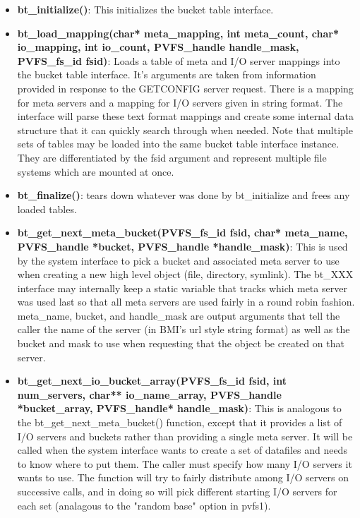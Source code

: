 \documentclass[12pt]{article} %
\begin{document}
\begin{itemize}
\item \textbf{bt\_initialize()}:
This initializes the bucket table interface.
\item \textbf{bt\_load\_mapping(char* meta\_mapping, int meta\_count,
char* io\_mapping, int io\_count, PVFS\_handle handle\_mask, PVFS\_fs\_id fsid)}: Loads a table
of meta and I/O server mappings into the bucket table interface.
It's arguments are taken from information provided in response to the
GETCONFIG server request.  There is a mapping for meta servers and a
mapping for I/O servers given in string format.  The interface
will parse these text format mappings and create some internal data structure that it can
quickly search through when needed.  Note that multiple sets of tables
may be loaded into the same bucket table interface instance.  They are
differentiated by the fsid argument and represent multiple file systems
which are mounted at once.
\item \textbf{bt\_finalize()}: tears down whatever was done by
bt\_initialize and frees any loaded tables.
\item \textbf{bt\_get\_next\_meta\_bucket(PVFS\_fs\_id fsid, char*
meta\_name, PVFS\_handle *bucket, PVFS\_handle *handle\_mask)}:  This is used by the system interface to pick a
bucket and associated meta server to use when creating a new high level
object (file, directory, symlink).  The bt\_XXX interface may internally
keep a static variable that tracks which meta server was used last so
that
all meta servers are used fairly in a round robin fashion.  meta\_name,
bucket, and handle\_mask are output arguments that tell the caller the name of the server
(in BMI's url style string format) as well as the bucket and mask to use
when requesting that the object be created on that server.  
\item \textbf{bt\_get\_next\_io\_bucket\_array(PVFS\_fs\_id fsid,
int num\_servers, char** io\_name\_array, PVFS\_handle *bucket\_array,
PVFS\_handle* handle\_mask)}:
This is analogous to the bt\_get\_next\_meta\_bucket()
function, except that it provides a list of I/O servers and
buckets rather than providing a single meta server.  It will be
called when the system interface wants to create a set of datafiles and
needs to know where to put them.  The caller must specify how many I/O
servers it wants to use.  The function will try to fairly distribute
among I/O servers on successive calls, and in doing so will pick
different starting I/O servers for each set (analagous to the
"random base"
option in pvfs1).

\end{itemize}
\end{document}

